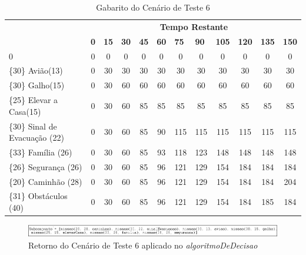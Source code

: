 \begin{table}[!h]
\centering
\caption{Gabarito do Cenário de Teste 6}
\label{gabarito6}
\begin{tabular}{lccccccccccc}
\multicolumn{1}{c}{\cellcolor[HTML]{00D2CB}} & \multicolumn{11}{c}{\cellcolor[HTML]{00D2CB}\textbf{Tempo Restante}} \\ 
\multicolumn{1}{c}{\cellcolor[HTML]{00D2CB}{\color[HTML]{333333} \textbf{\{Valor\} Missão(Tempo)}}} & 
\multicolumn{1}{l}{\cellcolor[HTML]{C0F2F0}\textbf{0}} & 
\multicolumn{1}{l}{\cellcolor[HTML]{C0F2F0}\textbf{15}} & 
\multicolumn{1}{l}{\cellcolor[HTML]{C0F2F0}\textbf{30}} & 
\multicolumn{1}{l}{\cellcolor[HTML]{C0F2F0}\textbf{45}} & 
\multicolumn{1}{l}{\cellcolor[HTML]{C0F2F0}\textbf{60}} & 
\multicolumn{1}{l}{\cellcolor[HTML]{C0F2F0}\textbf{75}} & 
\multicolumn{1}{l}{\cellcolor[HTML]{C0F2F0}\textbf{90}} & 
\multicolumn{1}{l}{\cellcolor[HTML]{C0F2F0}\textbf{105}} & 
\multicolumn{1}{l}{\cellcolor[HTML]{C0F2F0}\textbf{120}} & 
\multicolumn{1}{l}{\cellcolor[HTML]{C0F2F0}\textbf{135}} & 
\multicolumn{1}{l}{\cellcolor[HTML]{C0F2F0}\textbf{150}} \\ 
0 & 0 & 0 & 0 & 0 & 0 & 0 & 0 & 0 & 0 & 0 & 0  \\ 
\{30\}  Avião(13) & 0 & 30 & 30 & 30 & 30 & 30 & 30 & 30 & 30 & 30 & 30 \\ 
\{30\}  Galho(15) & 0 & 30 & 60 & 60 & 60 & 60 & 60 & 60 & 60 & 60 & 60  \\ 
\{25\}  Elevar a Casa(15)& 0 & 30 & 60 & 85 & 85  & 85  & 85  & 85 & 85 & 85 & 85 \\ 
\{30\}  Sinal de Evacuação (22) & 0 & 30 & 60 & 85 & 90 & 115 & 115  & 115 & 115 & 115 & 115 \\ 
\{33\}  Família (26) & 0 & 30 & 60 & 85 & 93  & 118  & 123  & 148 & 148 & 148 & 148 \\ 
\{26\}  Segurança (26) & 0 & 30 & 60 & 85 & 96  & 121  & 129  & 154 & 184 & 184 & 184 \\ 
\{20\}  Caminhão (28) & 0 & 30 & 60 & 85 & 96  & 121  & 129  & 154 & 184 & 184 & 204 \\ 
{\color[HTML]{FE0000} \{31\}  Obstáculos (40)} & 0 & 30 & 60 & 85 & 96  & 121  & 129  & 154 & 184 & 185 & 184 \\ 
\end{tabular}
\end{table}


\FloatBarrier
\begin{figure}[!h]
\centering
\includegraphics[keepaspectratio=true,scale=0.7]{figuras/resultado6.png}
\caption{Retorno do Cenário de Teste 6 aplicado no \textit{algoritmoDeDecisao}}
\label{resultado6}
\end{figure}


